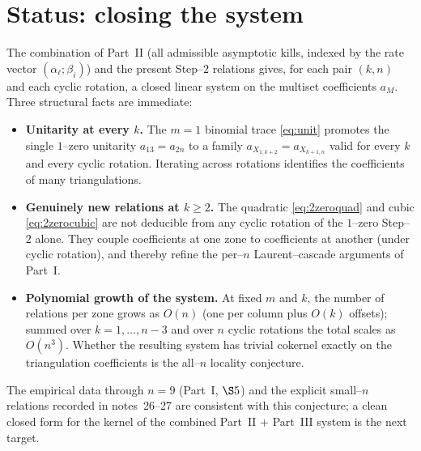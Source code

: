\documentclass[11pt]{article}
\theoremstyle{definition}
\newcommand{\X}[1]{X_{#1}}
\begin{document}
\section{Status: closing the system}
The combination of Part~II (all admissible asymptotic kills, indexed by the rate vector
$(\alpha_\ell;\beta_i)$) and the present Step--$2$ relations gives, for each pair $(k,n)$ and each
cyclic rotation, a closed linear system on the multiset coefficients $a_M$. Three structural facts
are immediate:
\begin{itemize}[topsep=2pt,itemsep=1pt]
  \item \textbf{Unitarity at every $k$.} The $m=1$ binomial trace \eqref{eq:unit} promotes the
  single $1$--zero unitarity $a_{13}=a_{2n}$ to a family $a_{\X{1,k+2}}=a_{\X{k+1,n}}$ valid for
  every $k$ and every cyclic rotation. Iterating across rotations identifies the coefficients of
  many triangulations.
  \item \textbf{Genuinely new relations at $k\ge2$.} The quadratic \eqref{eq:2zeroquad} and cubic
  \eqref{eq:2zerocubic} are not deducible from any cyclic rotation of the $1$--zero Step--$2$
  alone. They couple coefficients at one zone to coefficients at another (under cyclic rotation), and
  thereby refine the per--$n$ Laurent--cascade arguments of Part~I.
  \item \textbf{Polynomial growth of the system.} At fixed $m$ and $k$, the number of relations per
  zone grows as $O(n)$ (one per column plus $O(k)$ offsets); summed over $k=1,\dots,n-3$ and over
  $n$ cyclic rotations the total scales as $O(n^3)$. Whether the resulting system has trivial
  cokernel exactly on the triangulation coefficients is the all--$n$ locality conjecture.
\end{itemize}
The empirical data through $n=9$ (Part~I, $\S5$) and the explicit small--$n$ relations recorded in
notes~26--27 are consistent with this conjecture; a clean closed form for the kernel of the
combined Part~II + Part~III system is the next target.
\end{document}
